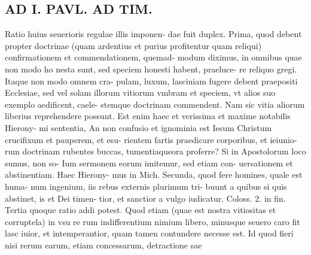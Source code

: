 \documentclass{article}
\begin{document}
\begin{pages}
\section*{AD I. PAVL. AD TIM. }
\marginpar{[ p.372 ]}\pstart Ratio huius seuerioris regulae illis imponen- dae fuit duplex. Prima, quod debent propter doctrinae (quam ardentius et purius profitentur quam reliqui) confirmationem et commendationem, quemad- modum diximus, in omnibus quae non modo ho nesta sunt, sed speciem honesti habent, praeluce- re reliquo gregi. Itaque non modo omnem cra- pulam, luxum, lasciuiam fugere debent praepositi Ecclesiae, sed vel solam illorum vitiorum vmbram et speciem, vt alios suo exemplo aedificent, caele- stemque doctrinam commendent. Nam sic vitia aliorum liberius reprehendere possunt. Est enim haec et verissima et maxime notabilis Hierony- mi sententia, An non confusio et ignominia est Iesum Christum crucifixum et pauperem, et esu- rientem fartis praedicare corporibus, et ieiunio- rum doctrinam rubentes buccas, tumentiaqueora proferre? Si in Apostolorum loco sumus, non so- Ium sermonem eorum imitemur, sed etiam con- uersationem et abstinentiam. Haec Hierony- mus in Mich. Secunda, quod fere homines, quale est huma- num ingenium, iis rebus externis plurimum tri- buunt a quibus si quis abstinet, is et Dei timen- tior, et sanctior a vulgo iudicatur. Coloss. 2. in fin. Tertia quoque ratio addi potest. Quod etiam (quae est nostra vitiositas et corruptela) in vsu re rum indifferentium nimium libero, minusque seuero caro fit lasc iuior, et intemperantior, quam tamen contundere necesse est. Id quod fieri nisi rerum earum, etiam concessarum, detractione sae  \pend

\end{pages}
\end{document}
